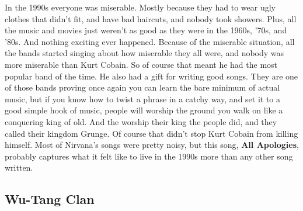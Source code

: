 \documentclass[letterpaper,]{article}
\begin{document}
In the 1990s everyone was miserable. Mostly because they had to wear
ugly clothes that didn't fit, and have bad haircuts, and nobody took
showers. Plus, all the music and movies just weren't as good as they
were in the 1960s, '70s, and '80s. And nothing exciting ever happened.
Because of the miserable situation, all the bands started singing about
how miserable they all were, and nobody was more miserable than Kurt
Cobain. So of course that meant he had the most popular band of the
time. He also had a gift for writing good songs. They are one of those
bands proving once again you can learn the bare minimum of actual music,
but if you know how to twist a phrase in a catchy way, and set it to a
good simple hook of music, people will worship the ground you walk on
like a conquering king of old. And the worship their king the people
did, and they called their kingdom Grunge. Of course that didn't stop
Kurt Cobain from killing himself. Most of Nirvana's songs were pretty
noisy, but this song, \textbf{All Apologies}, probably captures what it
felt like to live in the 1990s more than any other song written.

\hypertarget{wu-tang-clan}{%
\subsection{Wu-Tang Clan}\label{wu-tang-clan}}
\end{document}
